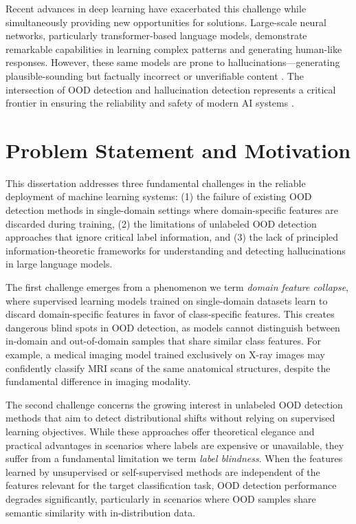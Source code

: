\documentclass[11pt, oneside]{book}
\theoremstyle{plain}
\theoremstyle{definition}
\theoremstyle{remark}
\begin{document}
Recent advances in deep learning have exacerbated this challenge while simultaneously providing new opportunities for solutions. Large-scale neural networks, particularly transformer-based language models, demonstrate remarkable capabilities in learning complex patterns and generating human-like responses. However, these same models are prone to hallucinations—generating plausible-sounding but factually incorrect or unverifiable content \citep{li2023halueval,lin2021truthfulqa}. The intersection of OOD detection and hallucination detection represents a critical frontier in ensuring the reliability and safety of modern AI systems \citep{huang2020survey}.

\section{Problem Statement and Motivation}

This dissertation addresses three fundamental challenges in the reliable deployment of machine learning systems: (1) the failure of existing OOD detection methods in single-domain settings where domain-specific features are discarded during training, (2) the limitations of unlabeled OOD detection approaches that ignore critical label information, and (3) the lack of principled information-theoretic frameworks for understanding and detecting hallucinations in large language models.

The first challenge emerges from a phenomenon we term \emph{domain feature collapse}, where supervised learning models trained on single-domain datasets learn to discard domain-specific features in favor of class-specific features. This creates dangerous blind spots in OOD detection, as models cannot distinguish between in-domain and out-of-domain samples that share similar class features. For example, a medical imaging model trained exclusively on X-ray images may confidently classify MRI scans of the same anatomical structures, despite the fundamental difference in imaging modality.

The second challenge concerns the growing interest in unlabeled OOD detection methods that aim to detect distributional shifts without relying on supervised learning objectives. While these approaches offer theoretical elegance and practical advantages in scenarios where labels are expensive or unavailable, they suffer from a fundamental limitation we term \emph{label blindness}. When the features learned by unsupervised or self-supervised methods are independent of the features relevant for the target classification task, OOD detection performance degrades significantly, particularly in scenarios where OOD samples share semantic similarity with in-distribution data.
\end{document}
